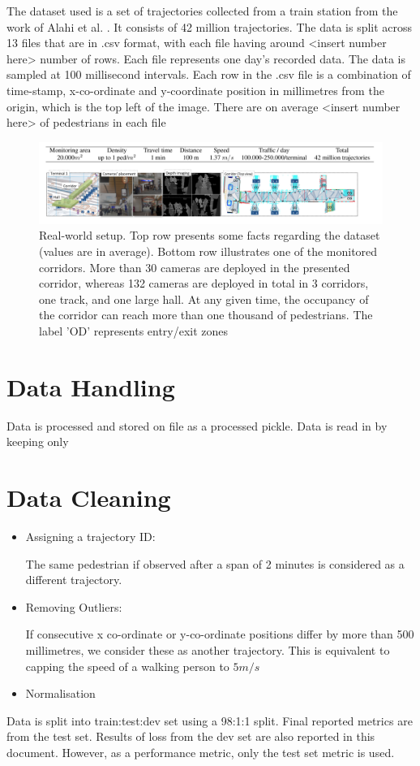 The dataset used is a set of trajectories collected from a train station from the work of Alahi et al. \cite{alahi_socially-aware_2014}. It consists of 42 million trajectories. 
The data is split across 13 files that are in .csv format, with each file having around <insert number here> number of rows. Each file represents one day's recorded data. The data is sampled at 100 millisecond intervals. Each row in the .csv file is a combination of time-stamp, x-co-ordinate and y-coordinate position in millimetres from the origin, which is the top left of the image. There are on average <insert number here> of pedestrians in each file
\begin{figure}
    \centering
    \includegraphics[width=\textwidth]{Figures/Dataset_explanation.png}
    \caption[Key info of Dataset used]{Real-world setup. Top row presents some facts regarding the dataset (values are in average). Bottom row illustrates one of the monitored corridors. More than 30 cameras are deployed in the presented corridor, whereas 132 cameras are deployed in total in 3 corridors, one track, and one large hall. At any given time, the occupancy of the corridor can reach more than one thousand of pedestrians. The label 'OD' represents entry/exit zones }

    \label{fig:dataset_explanation}
\end{figure}

\section{Data Handling}
Data is processed and stored on file as a processed pickle.
Data is read in by keeping only 




\section{Data Cleaning}
\begin{itemize}
    \item Assigning a trajectory ID:
    
    The same pedestrian if observed after a span of 2 minutes is considered as a different trajectory.
    
    \item Removing Outliers:
    
    If consecutive x co-ordinate or y-co-ordinate positions differ by more than 500 millimetres, we consider these as another trajectory. This is equivalent to capping the speed of a walking person to \(5 m/s\)
    
    \item Normalisation
    

\end{itemize}

Data is split into train:test:dev set using a 98:1:1 split.
Final reported metrics are from the test set. Results of loss from the dev set are also reported in this document. However, as a performance metric, only the test set metric is used.









